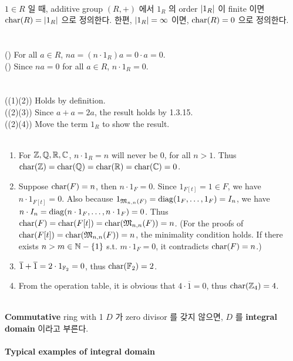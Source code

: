 \\
 $1\in R$ 일 때, additive group $(R, +)$ 에서 $1_R$ 의 order $\left|1_R\right|$ 이 finite 이면 $\operatorname{char}(R) = \left|1_R\right|$ 으로 정의한다. 한편, $\left|1_R\right|=\infty$ 이면, $\operatorname{char}(R)=0$ 으로 정의한다.\\
\\
\\
(\mimp) For all $a\in R$, $na = (n\cdot 1_R)a =0\cdot a = 0$.\\
(\mimpb) Since $na = 0$ for all $a\in R$, $n\cdot 1_R = 0$.\\
\\
\\
((1)\miff(2)) Holds by definition.\\
((2)\miff(3)) Since $a+a = 2a$, the result holds by 1.3.15.\\
((2)\miff(4)) Move the term $1_R$ to show the result.\\
\\
\begin{enumerate}
	\item For $\mathbb{Z}, \mathbb{Q}, \mathbb{R}, \mathbb{C}$, $n \cdot 1_R = n$ will never be 0, for all $n > 1$. Thus $\operatorname{char}(\mathbb{Z}) =\operatorname{char}(\mathbb{Q}) =\operatorname{char}(\mathbb{R}) = \operatorname{char}(\mathbb{C}) = 0$.
	\item Suppose $\operatorname{char}(F) = n$, then $n\cdot 1_F = 0$. Since $1_{F[t]} = 1\in F$, we have $n\cdot 1_{F[t]} = 0$. Also because $1_{\mathfrak{M}_{n, n}(F)} = \operatorname{diag}(1_F, \dots, 1_F) = I_n$, we have $n\cdot I_n = \operatorname{diag}(n\cdot 1_F, \dots, n\cdot 1_F) = 0$. Thus $\operatorname{char}(F) = \operatorname{char}(F[t]) = \operatorname{char}(\mathfrak{M}_{n, n}(F)) = n$. (For the proofs of $\operatorname{char}(F[t]) = \operatorname{char}(\mathfrak{M}_{n, n}(F)) = n$, the minimality condition holds. If there exists $n > m\in \mathbb{N} - \{1\}$ s.t. $m\cdot 1_F = 0$, it contradicts $\operatorname{char}(F) = n$.)
	\item $\overline{1} + \overline{1} = 2\cdot 1_{\mathbb{F}_2} = 0$, thus $\operatorname{char}(\mathbb{F}_2) = 2$.
	\item From the operation table, it is obvious that $4\cdot \overline{1} = 0$, thus $\operatorname{char}(\mathbb{Z}_4) = 4$.
\end{enumerate}~
\\
 \textbf{Commutative} ring with 1 $D$ 가 zero divisor 를 갖지 않으면, $D$ 를 \textbf{integral domain} 이라고 부른다.\\
\\
 \textbf{Typical examples of integral domain}
